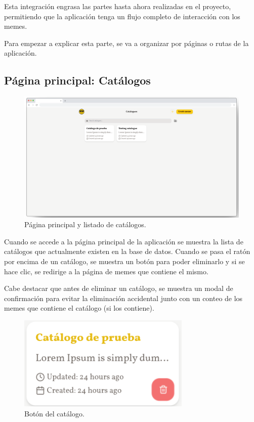 Esta integración engrasa las partes hasta ahora realizadas en el proyecto, permitiendo que la aplicación tenga un flujo completo de interacción con los memes.

Para empezar a explicar esta parte, se va a organizar por páginas o rutas de la aplicación.

\subsection{Página principal: Catálogos}

\begin{figure}[H]
    \caption{Página principal y listado de catálogos.}
    \centering
    \vspace*{0.5cm}
    \includegraphics[scale=0.33]{figuras/catalogos.png}
\end{figure}

Cuando se accede a la página principal de la aplicación se muestra la lista de catálogos que actualmente existen en la base de datos. Cuando se pasa el ratón por encima de un catálogo, se muestra un botón para poder eliminarlo y si se hace clic, se redirige a la página de memes que contiene el mismo.

Cabe destacar que antes de eliminar un catálogo, se muestra un modal de confirmación para evitar la eliminación accidental junto con un conteo de los memes que contiene el catálogo (si los contiene).

\begin{figure}[H]
    \caption{Botón del catálogo.}
    \centering
    \vspace*{0.5cm}
    \includegraphics[scale=0.4]{figuras/card_catalogo.png}
\end{figure}

